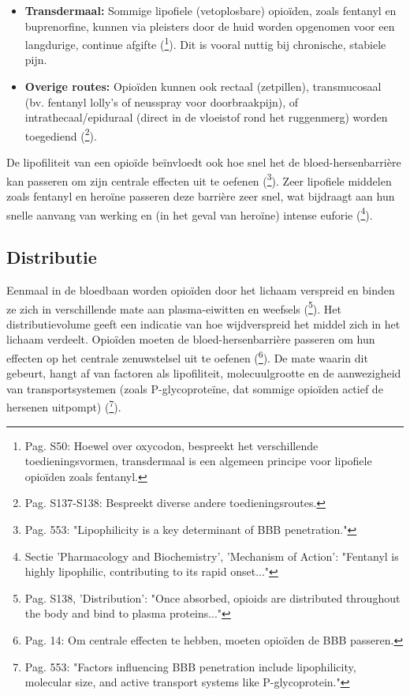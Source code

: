 \documentclass[11pt, a4paper]{report} %
\begin{document}
\begin{itemize}
    \item \textbf{Transdermaal:} Sommige lipofiele (vetoplosbare) opioïden, zoals fentanyl en buprenorfine, kunnen via pleisters door de huid worden opgenomen voor een langdurige, continue afgifte (\cite{Kalso2005OxycodoneReview}\footnote{Pag. S50: Hoewel over oxycodon, bespreekt het verschillende toedieningsvormen, transdermaal is een algemeen principe voor lipofiele opioïden zoals fentanyl.}). Dit is vooral nuttig bij chronische, stabiele pijn.
    \item \textbf{Overige routes:} Opioïden kunnen ook rectaal (zetpillen), transmucosaal (bv. fentanyl lolly's of neusspray voor doorbraakpijn), of intrathecaal/epiduraal (direct in de vloeistof rond het ruggenmerg) worden toegediend (\cite{Trescot2008OpioidPharm}\footnote{Pag. S137-S138: Bespreekt diverse andere toedieningsroutes.}).
\end{itemize}
De lipofiliteit van een opioïde beïnvloedt ook hoe snel het de bloed-hersenbarrière kan passeren om zijn centrale effecten uit te oefenen (\cite{GutsteinAkil2006OpioidAnalgesics}\footnote{Pag. 553: "Lipophilicity is a key determinant of BBB penetration."}). Zeer lipofiele middelen zoals fentanyl en heroïne passeren deze barrière zeer snel, wat bijdraagt aan hun snelle aanvang van werking en (in het geval van heroïne) intense euforie (\cite{PubChemfentanyl}\footnote{Sectie 'Pharmacology and Biochemistry', 'Mechanism of Action': "Fentanyl is highly lipophilic, contributing to its rapid onset..."}).

\subsection{Distributie}
Eenmaal in de bloedbaan worden opioïden door het lichaam verspreid en binden ze zich in verschillende mate aan plasma-eiwitten en weefsels (\cite{Trescot2008OpioidPharm}\footnote{Pag. S138, 'Distribution': "Once absorbed, opioids are distributed throughout the body and bind to plasma proteins..."}). Het distributievolume geeft een indicatie van hoe wijdverspreid het middel zich in het lichaam verdeelt. Opioïden moeten de bloed-hersenbarrière passeren om hun effecten op het centrale zenuwstelsel uit te oefenen (\cite{Kosten2002NeurobiologyDependence}\footnote{Pag. 14: Om centrale effecten te hebben, moeten opioïden de BBB passeren.}). De mate waarin dit gebeurt, hangt af van factoren als lipofiliteit, molecuulgrootte en de aanwezigheid van transportsystemen (zoals P-glycoproteïne, dat sommige opioïden actief de hersenen uitpompt) (\cite{GutsteinAkil2006OpioidAnalgesics}\footnote{Pag. 553: "Factors influencing BBB penetration include lipophilicity, molecular size, and active transport systems like P-glycoprotein."}).
\end{document}
